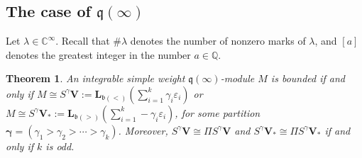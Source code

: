 \documentclass[12pt]{amsart}
\newcommand\C{\mathbb{C}}
\newcommand\Q{\mathbb{Q}}
\newcommand\fq{\mathfrak{q}}
\newcommand\fb{\mathfrak{b}}
\newcommand\bV{\mathbf{V}}
\newcommand\bL{\mathbf{L}}
\theoremstyle{plain}
\newtheorem{theo}{Theorem}[section]
\theoremstyle{definition}
\numberwithin{equation}{section}
\begin{document}
\subsection{The case of $\fq(\infty)$} 

Let $\lambda\in \C^\infty$. Recall that $\# \lambda$ denotes the number of nonzero marks of $\lambda$, and $[a]$ denotes the greatest integer in the number $a\in \Q$.

\begin{theo}\label{thm:classification.q}
An integrable simple weight $\fq(\infty)$-module $M$ is bounded if and only if $M\cong S^\gamma \bV := \bL_{\fb(<)} (\sum_{i=1}^k \gamma_i\varepsilon_i)$ or $M\cong S^\gamma \bV_* := \bL_{\fb(>)} (\sum_{i=1}^k -\gamma_i\varepsilon_i)$, for some partition $\pmb{\gamma} = (\gamma_1> \gamma_2> \cdots > \gamma_k)$. Moreover, $S^\gamma \bV\cong \Pi S^\gamma \bV$ and $S^\gamma \bV_*\cong \Pi S^\gamma \bV_*$ if and only if $k$ is odd.
\end{theo}
\end{document}
